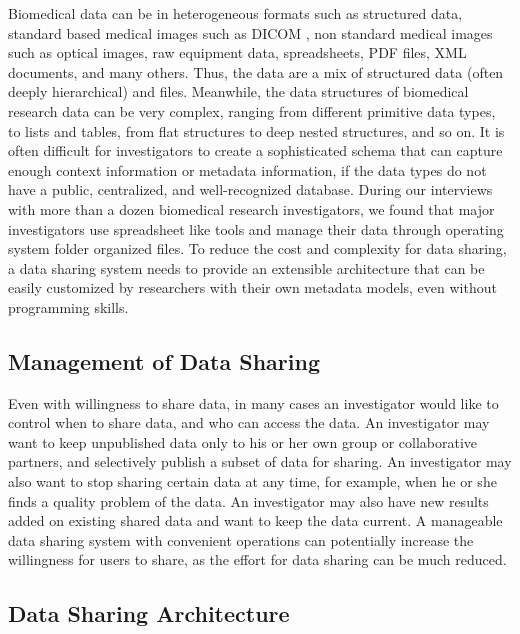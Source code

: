\documentclass{singlecol-new}
\theoremstyle{TH}{
\newtheorem{lemma}{Lemma}
\newtheorem{theorem}[lemma]{Theorem}
\newtheorem{corrolary}[lemma]{Corrolary}
\newtheorem{conjecture}[lemma]{Conjecture}
\newtheorem{proposition}[lemma]{Proposition}
\newtheorem{claim}[lemma]{Claim}
\newtheorem{stheorem}[lemma]{Wrong Theorem}
\newtheorem{algorithm}{Algorithm}
}
\theoremstyle{THrm}{
\newtheorem{definition}{Definition}[section]
\newtheorem{question}{Question}[section]
\newtheorem{remark}{Remark}
\newtheorem{scheme}{Scheme}
}
\theoremstyle{THhit}{
\newtheorem{case}{Case}[section]
}
\begin{document}
Biomedical data can be in heterogeneous formats such as structured
data, standard based medical images such as DICOM \cite{dicom}, non
standard medical images such as optical images, raw equipment data,
spreadsheets, PDF files,  XML documents, and many others. Thus, the
data are  a mix of structured data (often deeply hierarchical) and
files. Meanwhile, the data structures of biomedical research data
can be very complex, ranging from different primitive data types, to
lists and tables, from flat structures to deep nested structures,
and so on.  It is often difficult for investigators to create a
sophisticated schema that can capture enough context information or
metadata information, if the data types do not have a public,
centralized, and well-recognized database. During our interviews
with more than a dozen biomedical research investigators, we found
that major investigators use spreadsheet like tools and manage their
data through operating system folder organized files. To reduce the
cost and complexity for data sharing, a data sharing system needs to
provide an extensible architecture that can be easily customized by
researchers with their own metadata models, even without programming
skills.

\subsection{Management of Data Sharing}

Even with willingness to share data, in many cases an investigator
would like to control when to share data, and who can access the
data. An investigator may want to keep unpublished data only to his
or her own group or collaborative partners, and selectively publish
a subset of data for sharing. An investigator may also want to stop
sharing certain data at any time, for example, when he or she finds
a quality problem of the data. An investigator may also have new
results added on existing shared data and want to keep the data
current. A manageable data sharing system with convenient operations
can potentially increase the willingness for users to share, as the
effort for data sharing can be much reduced.


\subsection{Data Sharing Architecture}
\end{document}

